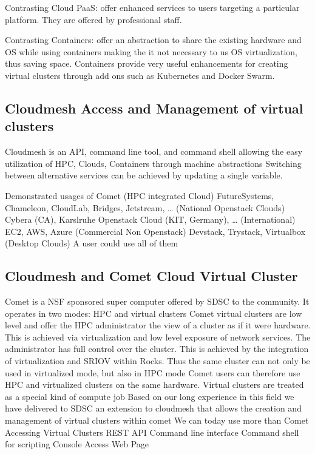 Contrasting Cloud PaaS: offer enhanced services to users targeting a
particular platform. They are offered by professional staff.

Contrasting Containers: offer an abstraction to share the existing hardware and OS while using containers making the it not necessary to us OS virtualization, thus saving space. Containers provide very useful enhancements for creating virtual clusters through add ons such as Kubernetes and Docker Swarm.



\subsection{Cloudmesh Access and Management of virtual clusters}
Cloudmesh is an API, command line tool, and command shell allowing the easy utilization of HPC, Clouds, Containers through machine abstractions
Switching between alternative services can be achieved by updating a
single variable.

Demonstrated usages of
Comet                                                                                           (HPC integrated Cloud)
FutureSystems, Chameleon, CloudLab, Bridges, Jetstream, …  (National Openstack Clouds)
Cybera (CA), Karslruhe Openstack Cloud (KIT, Germany), …     (International)
EC2, AWS, Azure                                                                          (Commercial Non Openstack)
Devstack, Trystack, Virtualbox                                                       (Desktop Clouds)
A user could use all of them

\subsection{Cloudmesh and Comet Cloud Virtual Cluster}
Comet is a NSF sponsored super computer offered by SDSC to the community. It operates in two modes: HPC and virtual clusters
Comet virtual clusters are low level and offer the HPC administrator the view of a cluster as if it were hardware. This is achieved via virtualization and low level exposure of network services. The administrator has full control over the cluster.
This is achieved by the integration of virtualization and SRIOV within Rocks. Thus the same cluster can not only be used in virtualized mode, but also in HPC mode
Comet users can therefore use HPC and virtualized clusters on the same hardware. Virtual clusters are treated as a special kind of compute job
Based on our long experience in this field we have delivered to SDSC an extension to cloudmesh that allows the creation and management of virtual clusters within comet
We can today use more than Comet
Accessing Virtual Clusters
REST API
Command line interface
Command shell for scripting
Console Access
Web Page

